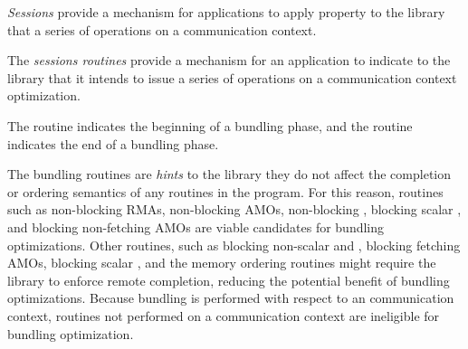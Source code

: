 \openSHMEM \emph{Sessions} provide a mechanism for applications to apply property to
the \openshmem library that a series of operations on a communication context.


The \emph{sessions routines} provide a mechanism for an application to
indicate to the \openshmem
library that it intends to issue a series of operations on a
communication context optimization.

The  routine indicates the beginning of a bundling
phase, and the  routine indicates the end of a
bundling phase.

The bundling routines are \textit{hints} to the \openshmem library\newtext{;}\oldtext{,}
 they do not affect the completion or ordering semantics of any \openshmem
routines in the program.
For this reason, routines such as non-blocking RMAs, non-blocking AMOs,
non-blocking , blocking scalar , and blocking
non-fetching AMOs are viable candidates for bundling optimizations.
Other routines, such as blocking non-scalar  and , blocking
fetching AMOs, blocking scalar , and the memory ordering routines
might require the library to enforce remote completion, reducing the potential
benefit of bundling optimizations.
Because bundling is performed with respect to an \openshmem communication
context, routines not performed on a communication context  are ineligible for
bundling optimization.
